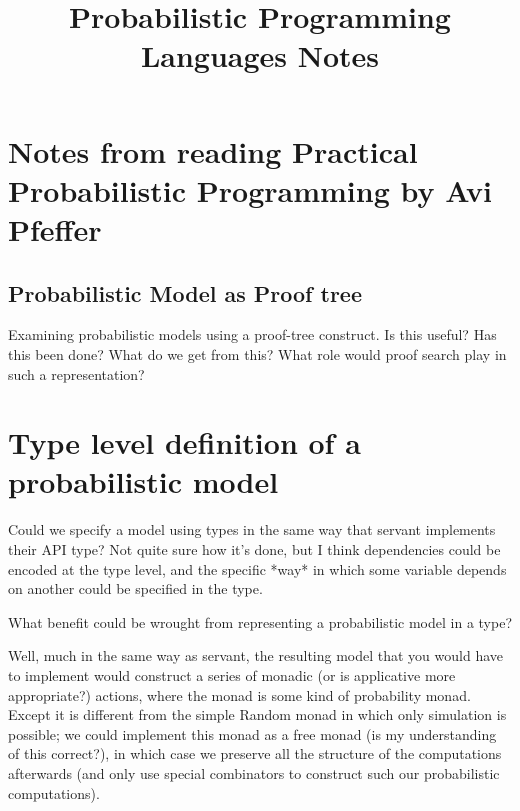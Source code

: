 \documentclass{article}
\title{Probabilistic Programming Languages Notes}
\begin{document}
\maketitle

\section{Notes from reading Practical Probabilistic Programming by Avi Pfeffer}

\subsection{Probabilistic Model as Proof tree}

Examining probabilistic models using a proof-tree construct.
Is this useful? Has this been done? What do we get from this?
What role would proof search play in such a representation?

\section{Type level definition of a probabilistic model}

Could we specify a model using types in the same way that
servant implements their API type? Not quite sure how it's
done, but I think dependencies could be encoded at the type
level, and the specific *way* in which some variable depends
on another could be specified in the type.

What benefit could be wrought from representing a probabilistic
model in a type?

Well, much in the same way as servant, the resulting
model that you would have to implement would construct
a series of monadic (or is applicative more appropriate?)
actions, where the monad is some kind of probability monad.
Except it is different from the simple Random monad in
which only simulation is possible; we could implement
this monad as a free monad (is my understanding of this
correct?), in which case we preserve all
the structure of the computations afterwards (and only use
special combinators to construct such our probabilistic
computations).
\end{document}
